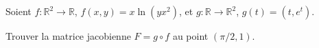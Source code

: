 \begin{exercice}\label{exocontrolecontinu0007}
 
Soient $f:\mathbb{R}^2\to \mathbb{R}$, $f(x,y)=x\ln(yx^2)$, et $g:\mathbb{R}\to \mathbb{R}^2$, $g(t)=(t, e^t)$. 

Trouver la matrice jacobienne $F=g\circ f$ au point $(\pi/2, 1)$.


\end{exercice}


